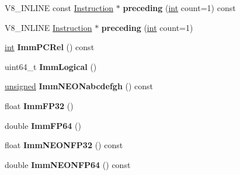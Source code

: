 \begin{DoxyCompactItemize}
\item 
\mbox{\label{classv8_1_1internal_1_1Instruction_ae45ab69b1719e4fd87e6f04da1ef1042}} 
V8\+\_\+\+I\+N\+L\+I\+NE const \mbox{\hyperlink{classv8_1_1internal_1_1Instruction}{Instruction}} $\ast$ {\bfseries preceding} (\mbox{\hyperlink{classint}{int}} count=1) const
\item 
\mbox{\label{classv8_1_1internal_1_1Instruction_a496c1fb4fbfec20f6de26b830bf2783e}} 
V8\+\_\+\+I\+N\+L\+I\+NE \mbox{\hyperlink{classv8_1_1internal_1_1Instruction}{Instruction}} $\ast$ {\bfseries preceding} (\mbox{\hyperlink{classint}{int}} count=1)
\item 
\mbox{\label{classv8_1_1internal_1_1Instruction_a839c5d07088fa8af82784224c96a3edf}} 
\mbox{\hyperlink{classint}{int}} {\bfseries Imm\+P\+C\+Rel} () const
\item 
\mbox{\label{classv8_1_1internal_1_1Instruction_a25a2f0b667877a3cd5e0a0d7002f9821}} 
uint64\+\_\+t {\bfseries Imm\+Logical} ()
\item 
\mbox{\label{classv8_1_1internal_1_1Instruction_a3ed55761d73a74c9c4e7fcd49302f377}} 
\mbox{\hyperlink{classunsigned}{unsigned}} {\bfseries Imm\+N\+E\+O\+Nabcdefgh} () const
\item 
\mbox{\label{classv8_1_1internal_1_1Instruction_ac8fe438043bca2df74631723e0f7a165}} 
float {\bfseries Imm\+F\+P32} ()
\item 
\mbox{\label{classv8_1_1internal_1_1Instruction_aa832a68318cd81db6e5ea7119ad5b4d5}} 
double {\bfseries Imm\+F\+P64} ()
\item 
\mbox{\label{classv8_1_1internal_1_1Instruction_a8aa6319a5fc345e3ce69ecb5ae34f23f}} 
float {\bfseries Imm\+N\+E\+O\+N\+F\+P32} () const
\item 
\mbox{\label{classv8_1_1internal_1_1Instruction_a1f0c238d64d00aa7d91f8f4bc3600a92}} 
double {\bfseries Imm\+N\+E\+O\+N\+F\+P64} () const

\end{DoxyCompactItemize}
